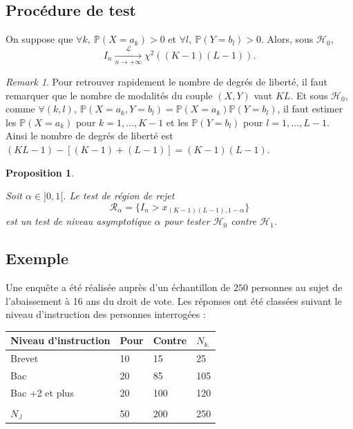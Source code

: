 \documentclass[
]{book}
\newtheorem{proposition}{Proposition}[chapter]
\theoremstyle{definition}
\theoremstyle{definition}
\theoremstyle{definition}
\theoremstyle{definition}
\theoremstyle{remark}
\newtheorem*{remark}{Remark}
\begin{document}
\hypertarget{procuxe9dure-de-test-2}{%
\subsection{Procédure de test}\label{procuxe9dure-de-test-2}}

On suppose que \(\forall k,\ \mathbb{P}(X=a_k)>0\) et \(\forall l,\ \mathbb{P}(Y=b_l)>0\). Alors, sous \(\mathcal{H}_0\),
\[
I_n \underset{n\rightarrow +\infty}{\stackrel{\mathcal L}{\longrightarrow}}\chi^2((K-1)(L-1)).
\]

\begin{remark}

Pour retrouver rapidement le nombre de degrés de liberté, il faut remarquer que le nombre de modalités du couple \((X, Y)\) vaut \(K L\). Et sous \(\mathcal{H}_0\), comme \(\forall (k,l),\ \mathbb{P}(X=a_k, Y=b_l) = \mathbb{P}(X=a_k)\mathbb{P}(Y=b_l)\), il faut estimer les \(\mathbb{P}(X=a_k)\) pour \(k=1,\ldots,K-1\) et les \(\mathbb{P}(Y=b_l)\) pour \(l=1,\ldots, L-1\). Ainsi le nombre de degrés de liberté est \((KL-1) - [(K-1)+(L-1)] = (K-1)(L-1)\).

\end{remark}

\begin{proposition}
\protect\hypertarget{prp:unlabeled-div-48}{}\label{prp:unlabeled-div-48}

Soit \(\alpha\in]0,1[\). Le test de région de rejet
\[
\mathcal R_\alpha = \{ I_n > x_{(K-1)(L-1),1-\alpha} \}
\]
est un test de niveau asymptotique \(\alpha\) pour tester \(\mathcal{H}_0\) contre \(\mathcal{H}_1\).

\end{proposition}

\hypertarget{exemple-1}{%
\subsection{Exemple}\label{exemple-1}}

Une enquête a été réalisée auprès d'un échantillon de \(250\) personnes au sujet de l'abaissement à 16 ans du droit de vote. Les réponses ont été classées suivant le niveau d'instruction des personnes interrogées :

\begin{longtable}[]{@{}llll@{}}
\toprule
Niveau d'instruction & Pour & Contre & \(N_{k.}\)\tabularnewline
\midrule
\endhead
Brevet & 10 & 15 & 25\tabularnewline
Bac & 20 & 85 & 105\tabularnewline
Bac +2 et plus & 20 & 100 & 120\tabularnewline
& & &\tabularnewline
\(N_{.l}\) & 50 & 200 & 250\tabularnewline
\bottomrule
\end{longtable}
\end{document}
